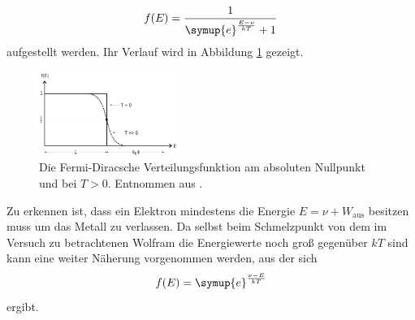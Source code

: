 \begin{equation}
    f(E) = \frac{1}{\symup{e}^{\frac{E-\nu}{kT}} +1}
\label{eqn:fermi_dirac}
\end{equation}
aufgestellt werden.
Ihr Verlauf wird in Abbildung \ref{fig:fermi_dirac} gezeigt.
\begin{figure}
    \centering
    \includegraphics[width=0.4\textwidth]{content/data/fermi_dirac.png}
    \caption{Die Fermi-Diracsche Verteilungsfunktion am absoluten Nullpunkt und bei $ T > 0$. Entnommen aus \cite[3]{anleitung}.}
    \label{fig:fermi_dirac}
\end{figure}
Zu erkennen ist, dass ein Elektron mindestens die Energie $E = \nu + W_\text{aus}$ besitzen muss um das Metall zu verlassen.
Da selbst beim Schmelzpunkt von dem im Versuch zu betrachtenen Wolfram die Energiewerte noch groß gegenüber $kT$ sind kann eine weiter Näherung vorgenommen werden, aus der sich 
\begin{equation*}
    f(E) = \symup{e}^{\frac{\nu - E}{kT}}
\end{equation*}
ergibt.

